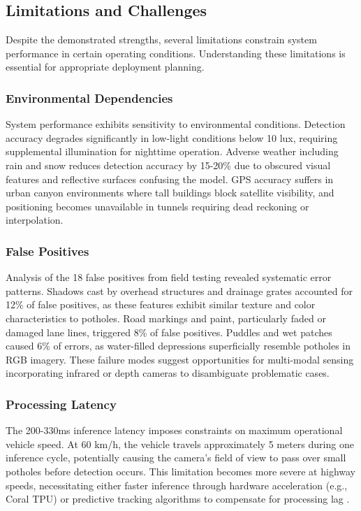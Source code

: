 \documentclass{ieeeaccess}
\begin{document}
\subsection{Limitations and Challenges}

Despite the demonstrated strengths, several limitations constrain system performance in certain operating conditions. Understanding these limitations is essential for appropriate deployment planning.

\subsubsection{Environmental Dependencies}
System performance exhibits sensitivity to environmental conditions. Detection accuracy degrades significantly in low-light conditions below 10 lux, requiring supplemental illumination for nighttime operation. Adverse weather including rain and snow reduces detection accuracy by 15-20\% due to obscured visual features and reflective surfaces confusing the model. GPS accuracy suffers in urban canyon environments where tall buildings block satellite visibility, and positioning becomes unavailable in tunnels requiring dead reckoning or interpolation.

\subsubsection{False Positives}
Analysis of the 18 false positives from field testing revealed systematic error patterns. Shadows cast by overhead structures and drainage grates accounted for 12\% of false positives, as these features exhibit similar texture and color characteristics to potholes. Road markings and paint, particularly faded or damaged lane lines, triggered 8\% of false positives. Puddles and wet patches caused 6\% of errors, as water-filled depressions superficially resemble potholes in RGB imagery. These failure modes suggest opportunities for multi-modal sensing incorporating infrared or depth cameras to disambiguate problematic cases.

\subsubsection{Processing Latency}
The 200-330ms inference latency imposes constraints on maximum operational vehicle speed. At 60 km/h, the vehicle travels approximately 5 meters during one inference cycle, potentially causing the camera's field of view to pass over small potholes before detection occurs. This limitation becomes more severe at highway speeds, necessitating either faster inference through hardware acceleration (e.g., Coral TPU) or predictive tracking algorithms to compensate for processing lag \cite{b10}.
\end{document}
